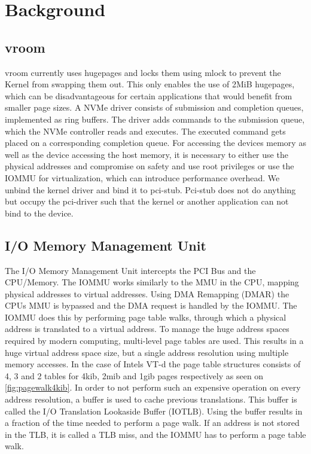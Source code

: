 \chapter{Background}

\section{vroom}
vroom currently uses hugepages and locks them using mlock to prevent the Kernel from swapping them out.
This only enables the use of 2MiB hugepages, which can be disadvantageous for certain applications that would benefit from smaller page sizes.
A NVMe driver consists of submission and completion queues, implemented as ring buffers.
The driver adds commands to the submission queue, which the NVMe controller reads and executes.
The executed command gets placed on a corresponding completion queue.
For accessing the devices memory as well as the device accessing the host memory, it is necessary to either use the physical addresses and compromise on safety and use root privileges or use the IOMMU for virtualization, which can introduce performance overhead.
We unbind the kernel driver and bind it to pci-stub. Pci-stub does not do anything but occupy the pci-driver such that the kernel or another application can not bind to the device.

\section{I/O Memory Management Unit}
The I/O Memory Management Unit intercepts the PCI Bus and the CPU/Memory.
The IOMMU works similarly to the MMU in the CPU, mapping physical addresses to virtual addresses.
Using DMA Remapping (DMAR) the CPUs MMU is bypassed and the DMA request is handled by the IOMMU.
The IOMMU does this by performing page table walks, through which a physical address is translated to a virtual address. To manage the huge address spaces required by modern computing, multi-level page tables are used. This results in a huge virtual address space size, but a single address resolution using multiple memory accesses. In the case of Intels VT-d the page table structures consists of 4, 3 and 2 tables for 4kib, 2mib and 1gib pages respectively as seen on \autoref{fig:pagewalk4kib}.
In order to not perform such an expensive operation on every address resolution, a buffer is used to cache previous translations. This buffer is called the I/O Translation Lookaside Buffer (IOTLB). Using the buffer results in a fraction of the time needed to perform a page walk. If an address is not stored in the TLB, it is called a TLB miss, and the IOMMU has to perform a page table walk.

